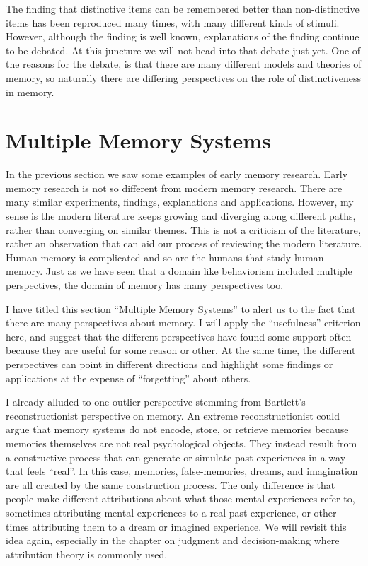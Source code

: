\documentclass[
  oneside,
  12pt]{crumpbook}
\begin{document}
The finding that distinctive items can be remembered better than non-distinctive items has been reproduced many times, with many different kinds of stimuli. However, although the finding is well known, explanations of the finding continue to be debated. At this juncture we will not head into that debate just yet. One of the reasons for the debate, is that there are many different models and theories of memory, so naturally there are differing perspectives on the role of distinctiveness in memory.

\hypertarget{multiple-memory-systems}{%
\section{Multiple Memory Systems}\label{multiple-memory-systems}}

In the previous section we saw some examples of early memory research. Early memory research is not so different from modern memory research. There are many similar experiments, findings, explanations and applications. However, my sense is the modern literature keeps growing and diverging along different paths, rather than converging on similar themes. This is not a criticism of the literature, rather an observation that can aid our process of reviewing the modern literature. Human memory is complicated and so are the humans that study human memory. Just as we have seen that a domain like behaviorism included multiple perspectives, the domain of memory has many perspectives too.

I have titled this section ``Multiple Memory Systems'' to alert us to the fact that there are many perspectives about memory. I will apply the ``usefulness'' criterion here, and suggest that the different perspectives have found some support often because they are useful for some reason or other. At the same time, the different perspectives can point in different directions and highlight some findings or applications at the expense of ``forgetting'' about others.

I already alluded to one outlier perspective stemming from Bartlett's reconstructionist perspective on memory. An extreme reconstructionist could argue that memory systems do not encode, store, or retrieve memories because memories themselves are not real psychological objects. They instead result from a constructive process that can generate or simulate past experiences in a way that feels ``real''. In this case, memories, false-memories, dreams, and imagination are all created by the same construction process. The only difference is that people make different attributions about what those mental experiences refer to, sometimes attributing mental experiences to a real past experience, or other times attributing them to a dream or imagined experience. We will revisit this idea again, especially in the chapter on judgment and decision-making where attribution theory is commonly used.
\end{document}
